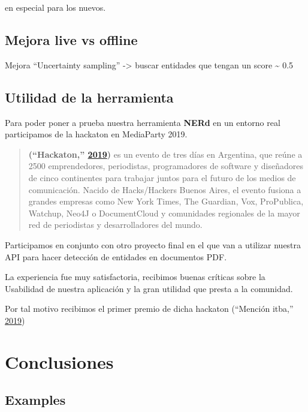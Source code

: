 \documentclass[12pt,a4paper,]{scrartcl}
\begin{document}
en especial para los nuevos.

\hypertarget{mejora-live-vs-offline}{%
\subsection{Mejora live vs offline}\label{mejora-live-vs-offline}}

Mejora \enquote{Uncertainty sampling} -\textgreater{} buscar entidades que tengan un score \textasciitilde{} 0.5

\hypertarget{utilidad-de-la-herramienta}{%
\subsection{Utilidad de la herramienta}\label{utilidad-de-la-herramienta}}

Para poder poner a prueba nuestra herramienta \textbf{NERd} en un entorno real participamos de la hackaton en MediaParty 2019.

\begin{quote}
\textbf{(``Hackaton,'' \protect\hyperlink{ref-hackaton2019}{2019})} es un evento de tres días en Argentina, que reúne a 2500 emprendedores, periodistas, programadores de software y diseñadores de cinco continentes para trabajar juntos para el futuro de los medios de comunicación.
Nacido de Hacks/Hackers Buenos Aires, el evento fusiona a grandes empresas como New York Times, The Guardian, Vox, ProPublica, Watchup, Neo4J o DocumentCloud y comunidades regionales de la mayor red de periodistas y desarrolladores del mundo.
\end{quote}

Participamos en conjunto con otro proyecto final en el que van a utilizar nuestra API para hacer detección de entidades en documentos PDF.

La experiencia fue muy satisfactoria, recibimos buenas críticas sobre la Usabilidad de nuestra aplicación y la gran utilidad que presta a la comunidad.

Por tal motivo recibimos el primer premio de dicha hackaton (``Mención itba,'' \protect\hyperlink{ref-mediaparty2019_win}{2019})

\hypertarget{conclusiones}{%
\section{Conclusiones}\label{conclusiones}}

\hypertarget{examples}{%
\subsection{Examples}\label{examples}}
\end{document}
